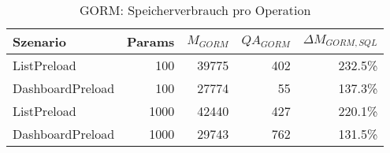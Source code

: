 
\begin{table}[ht]
\centering
\caption{GORM: Speicherverbrauch pro Operation}
\begin{tabular}{lrrrr}
\toprule
Szenario & Params & ${M_{GORM}}$ & ${QA_{GORM}}$ & ${\Delta M_{GORM,SQL}}$ \\
\midrule

	ListPreload & 100 & 39775 & 402 & 232.5\% \\
	DashboardPreload & 100 & 27774 & 55 & 137.3\% \\
	ListPreload & 1000 & 42440 & 427 & 220.1\% \\
	DashboardPreload & 1000 & 29743 & 762 & 131.5\% \\
\bottomrule
\end{tabular}
\label{tab:benchmark_gorm_bytesperop}
\end{table}
	